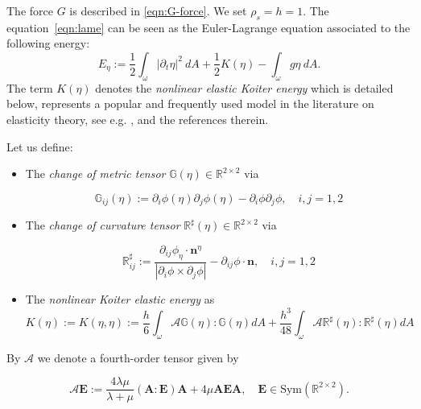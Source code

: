 \documentclass[10pt,a4paper]{article}
\numberwithin{equation}{section}
\begin{document}
The force $G$ is described in \eqref{eqn:G-force}.
We set $\rho_{s}=h=1$. The equation~\eqref{eqn:lame} can be seen as the Euler-Lagrange equation associated to the following energy:
\begin{equation}\label{eqn:energy-linear-shell}
E_{\eta}:=\frac{1}{2}\int_{\omega}\left|\partial_{t}\eta\right|^{2}\ dA+\frac{1}{2}K\left(\eta\right)-\int_{\omega}g\eta\ dA.
\end{equation}
The term $K(\eta)$ denotes the \emph{nonlinear elastic Koiter energy} which is detailed below, represents a popular and frequently used model in the literature on elasticity theory, see e.g. \cite{ciarlet2018nonlinear}, \cite[Part B]{ciarlet2000theory} and the references therein. 


Let us define:
\begin{itemize}
    \item The \emph{change of metric tensor} $\mathbb{G}\left(\eta\right)\in \mathbb{R}^{2\times2}$ via 

\begin{equation}
\mathbb{G}_{ij}\left(\eta\right):=\partial_{i}\phi\left(\eta\right)\partial_{j}\phi\left(\eta\right)-\partial_{i}\phi\partial_{j}\phi,\quad i,j=1,2 
\end{equation}


    

\item The \emph{change of curvature tensor} $\mathbb{R}^{\sharp}\left(\eta\right)\in\mathbb{R}^{2\times2}$ via


\begin{equation}
\mathbb{R}_{ij}^{\sharp}:=\frac{\partial_{ij}\phi_{\eta}\cdot\mathbf{n}^{\eta}}{\left|\partial_{i}\phi\times\partial_{j}\phi\right|}-\partial_{ij}\phi\cdot\mathbf{n},\quad i,j=1,2
\end{equation}

\item The \emph{nonlinear Koiter elastic energy} as
\begin{equation}\label{eqn:nonl-koiter}
K\left(\eta\right):=K\left(\eta, \eta \right):= \frac{h}{6}\int_{\omega}\mathcal{A}\mathbb{G}\left(\eta\right):\mathbb{G}\left(\eta\right)dA+\frac{h^{3}}{48}\int_{\omega}\mathcal{A}\mathbb{R}^{\sharp}\left(\eta\right):\mathbb{R}^{\sharp}\left(\eta\right)dA
\end{equation}
\end{itemize}
By $\mathcal{A}$ we denote a fourth-order tensor  given by


\begin{equation}
\mathcal{A}\mathbf{E}:=\frac{4\lambda\mu}{\lambda+\mu}\left(\mathbf{A}:\mathbf{E}\right)\mathbf{A}+4\mu\mathbf{A}\mathbf{E}\mathbf{A},\quad\mathbf{E}\in\text{Sym}\left(\mathbb{R}^{2\times2}\right).
\end{equation}
\end{document}
